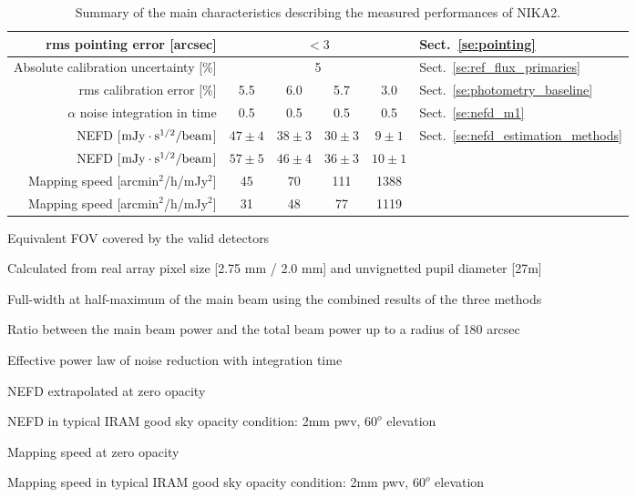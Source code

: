 \begin{table}[h]
\begin{center}
\begin{threeparttable}
\begin{tabular}{|r|c|c|c|c|l|}
      rms pointing error    [arcsec]             & \multicolumn{4}{|c|}{$<3$} &  Sect.~\ref{se:pointing} \\
      \hline
      Absolute calibration uncertainty [\%]      &  \multicolumn{4}{|c|}{5}   & Sect.~\ref{se:ref_flux_primaries} \\
      \hline
      rms calibration error [\%]                 &    5.5       &     6.0       &      5.7       &     3.0       & Sect.~\ref{se:photometry_baseline} \\
      \hline
      $\alpha$ noise integration in time\tnote{d}\hspace{1mm}  & 0.5  & 0.5  &  0.5 & 0.5 & Sect.~\ref{se:nefd_m1} \\
      \hline
      NEFD\tnote{f}\hspace{1mm} [$\rm{mJy} \cdot \rm{s}^{1/2}/\rm{beam}$]  & $47 \pm 4$ & $38 \pm 3$  & $30 \pm 3$  & $9 \pm 1$ & Sect.~\ref{se:nefd_estimation_methods}\\
      NEFD\tnote{g}\hspace{1mm} [$\rm{mJy} \cdot \rm{s}^{1/2}/\rm{beam}$]  & $57 \pm 5$ & $46 \pm 4$  & $36 \pm 3$  & $10 \pm 1$ & \\
      Mapping speed\tnote{h}\hspace{1mm} [arcmin$^2$/h/mJy$^2$] & 45  & 70  & 111  &  1388 &  \\
      Mapping speed\tnote{i}\hspace{1mm} [arcmin$^2$/h/mJy$^2$] & 31  & 48  &  77  &  1119 &  \\
\hline

\end{tabular}
  \begin{tablenotes}
{\small     
  \item[(a)] Equivalent FOV covered by the valid detectors
  \item[(b)] Calculated from real array pixel size [2.75 mm / 2.0 mm] and unvignetted pupil diameter [27m]
  \item[(c)] Full-width at half-maximum of the main beam using the combined results of the three methods
  \item[(d)] Ratio between the main beam power and the total beam power up to a radius of 180 arcsec
  \item[(e)] Effective power law of noise reduction with integration time
  \item[(f)] NEFD extrapolated at zero opacity
  \item[(g)] NEFD in typical IRAM good sky opacity condition: 2mm pwv, $60^o$ elevation
  \item[(h)] Mapping speed at zero opacity
  \item[(i)] Mapping speed in typical IRAM good sky opacity condition: 2mm pwv, $60^o$ elevation
}
  \end{tablenotes}
\end{threeparttable}
\caption[Main performance measurements]{Summary of the main characteristics describing the measured 
performances of NIKA2.}
\label{tab:nika2summary}
\end{center}  
\end{table}


